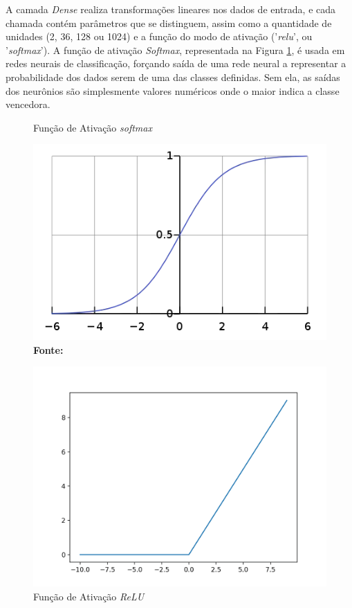 A camada \textit{Dense} realiza transformações lineares nos dados de entrada, e cada chamada contém parâmetros que se distinguem, assim como a quantidade de unidades (2, 36, 128 ou 1024) e a função do modo de ativação ('\textit{relu}', ou '\textit{softmax}'). A função de ativação \textit{Softmax}, representada na Figura \ref{fig:softmax}, é usada em redes neurais de classificação, forçando saída de uma rede neural a representar a probabilidade dos dados serem de uma das classes definidas. Sem ela, as saídas dos neurônios são simplesmente valores numéricos onde o maior indica a classe vencedora.
\begin{figure}[ht]
\centering
\begin{minipage}{0.45\textwidth}
  \centering
  \caption[\hspace{0.1cm}Grade Computacional.]{Função de Ativação \textit{softmax}}
  \vspace{-0.4cm}
  \includegraphics[width=\linewidth]{figuras/softmax.png}
  \captionsetup{justification=centering}
  \vspace{-0.2cm}
  \\\textbf{\footnotesize Fonte: \cite{softmax}}
  \label{fig:softmax}
\end{minipage}\hfill
\begin{minipage}{0.45\textwidth}
  \centering
  \caption[\hspace{0.1cm}Grade Computacional.]{Função de Ativação \textit{ReLU}}
  \vspace{-0.4cm}
  \includegraphics[width=\linewidth]{figuras/relu.png}

\end{minipage}
\end{figure}
